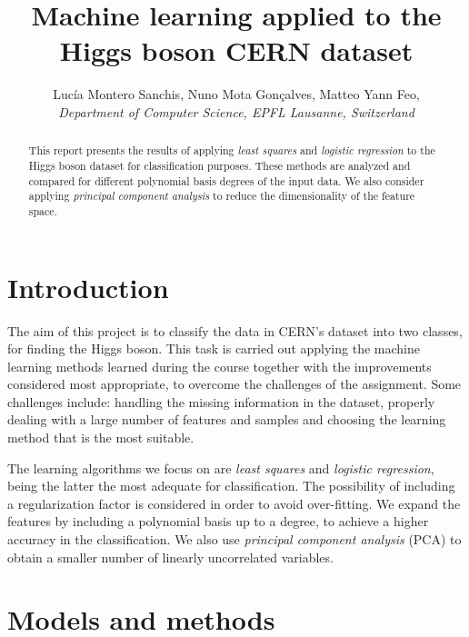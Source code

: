 \documentclass[10pt,conference,compsocconf]{IEEEtran}
\begin{document}
\title{Machine learning applied to the Higgs boson CERN dataset}

\author{
  Luc\'{i}a Montero Sanchis, Nuno Mota Gon\c{c}alves, Matteo Yann Feo,  \\
  \textit{Department of Computer Science, EPFL Lausanne, Switzerland}
}

\maketitle

\begin{abstract}
  This report presents the results of applying \textit{least squares} and \textit{logistic regression} to the Higgs boson dataset for classification purposes. These methods are analyzed and compared for different polynomial basis degrees of the input data. We also consider applying \textit{principal component analysis} to reduce the dimensionality of the feature space.
\end{abstract}

\section{Introduction}
	The aim of this project is to classify the data in CERN's dataset into two classes, for finding the Higgs boson. This task is carried out applying the machine learning methods learned during the course together with the improvements considered most appropriate, to overcome the challenges of the assignment. Some challenges include: handling the missing information in the dataset, properly dealing with a large number of features and samples and choosing the learning method that is the most suitable.

	The learning algorithms we focus on are \textit{least squares} and \textit{logistic regression}, being the latter the most adequate for classification. The possibility of including a regularization factor is considered in order to avoid over-fitting. We expand the features by including a polynomial basis up to a degree, to achieve a higher accuracy in the classification. We also use \textit{principal component analysis} (PCA) to obtain a smaller number of linearly uncorrelated variables.


\section{Models and methods}
	\label{sec:models-methods}
\end{document}
